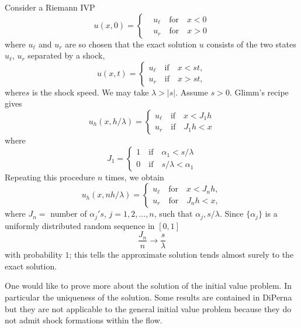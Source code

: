 Consider a Riemann IVP
$$
u(x,0) = 
\begin{cases}
& u_\ell \quad \text{for} \quad x < 0\\
& u_r \quad \text{for} \quad x > 0
\end{cases}
$$
where $u_\ell$ and $u_r$ are so chosen that the exact solution $u$ consists of the two states $u_\ell$, $u_r$ separated by  a shock,
\begin{equation*}
u(x,t) = 
\begin{cases}
u_\ell \quad \text{if} \quad x < st,\\
u_r \quad \text{if} \quad x > st,
\end{cases}
\tag{2.46}\label{eq2.46}
\end{equation*}
where\pageoriginale $s$ is the shock speed. We may take $\lambda >|s|$. Assume $s>0$. Glimm's recipe gives
$$
u_h (x,h/\lambda) =
\begin{cases}
u_\ell \quad \text{if} \quad x < J_1 h\\
u_r \quad \text{if} \quad J_1 h < x
\end{cases}
$$
where
$$
J_1 = 
\begin{cases}
1 \quad \text{if} \quad  \alpha_1 < s/ \lambda\\
0 \quad \text{if} \quad s /\lambda < \alpha_1
\end{cases}
$$
Repeating this procedure $n$ times, we obtain
$$ 
u_h(x, nh/\lambda) =
\begin{cases}
u_\ell \quad \text{for} \quad x < J_nh,\\
u_r \quad \text{for} \quad J_nh < x,
\end{cases}
$$
where $J_n = $ number of $\alpha_j's$, $j = 1,2,\ldots, n$, such that $\alpha_j , s / \lambda$. Since $\{\alpha_j\}$ is a uniformly distributed random sequence in $[0,1]$
$$
\frac{J_n}{n} \to \frac{s}{\lambda}
$$
with probability $1$; this tells the approximate solution tends almost surely to the exact solution.

One would like to prove more about the solution of the initial value problem. In particular the uniqueness of the solution. Some results are contained in DiPerna \cite{key8} but they are not applicable to the general initial value problem because they do not admit shock formations within the flow.

